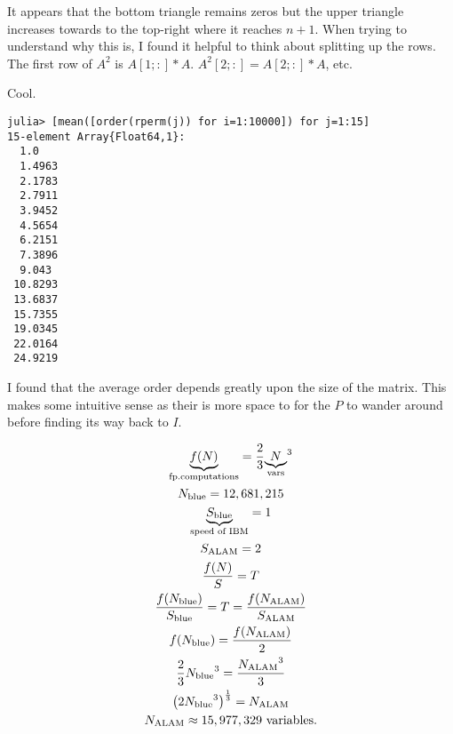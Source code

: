 \documentclass{mshw}
\begin{document}
It appears that the bottom triangle remains zeros but the upper triangle increases towards to the top-right where it reaches $n+1$.
When trying to understand why this is, I found it helpful to think about splitting up the rows. The first row of $A^2$ is $A[1;:]*A$. $A^2[2;:] = A[2;:]*A$, etc.


\newpage
{}
Cool.
\begin{lstlisting}
julia> [mean([order(rperm(j)) for i=1:10000]) for j=1:15]
15-element Array{Float64,1}:
  1.0
  1.4963
  2.1783
  2.7911
  3.9452
  4.5654
  6.2151
  7.3896
  9.043
 10.8293
 13.6837
 15.7355
 19.0345
 22.0164
 24.9219
\end{lstlisting}
I found that the average order depends greatly upon the size of the matrix. This makes some intuitive sense as their is more space to for the $P$ to wander around before finding its way back to $I$.


\newpage
{}
\begin{gather*}
\underbrace{f(N)}_\text{fp.computations} = \frac23 {\underbrace{N}_\text{vars}}^3 \\
N_\text{blue} = 12,681,215 \\
\underbrace{S_\text{blue}}_\text{speed of IBM} = 1 \\
S_\text{ALAM} = 2 \\
\frac{f(N)}S = T \\
\frac{f(N_\text{blue})}{S_\text{blue}} = T
= \frac{f(N_\text{ALAM})}{S_\text{ALAM}} \\
f(N_\text{blue}) = \frac{f(N_\text{ALAM})}2 \\
\frac23 {N_\text{blue}}^3 = \frac{{N_\text{ALAM}}^3}3 \\
{\left(2 {N_\text{blue}}^3\right)}^{\frac13} = {N_\text{ALAM}} \\
N_\text{ALAM} \approx 15,977,329 \text{ variables.}
\end{gather*}
\end{document}
